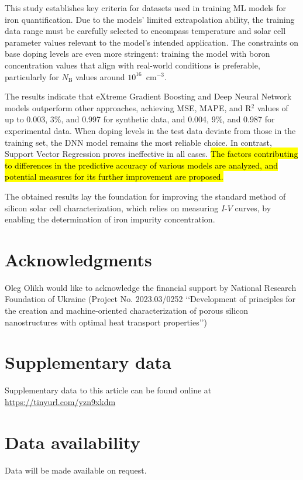 \documentclass[a4paper,fleqn,draft]{cas-sc}
\begin{document}
This study establishes key criteria for datasets used in training ML models for iron quantification.
Due to the models' limited extrapolation ability, the training data range must be carefully selected
to encompass temperature and solar cell parameter values relevant to the model’s intended application.
The constraints on base doping levels are even more stringent:
training the model with boron concentration values that align with real-world conditions is preferable, particularly for $N_\mathrm{B}$ values
around $10^{16}$~cm$^{-3}$.


The results indicate that eXtreme Gradient Boosting and Deep Neural Network models outperform other approaches,
achieving MSE, MAPE, and R$^2$ values of up to 0.003, 3\%, and 0.997 for synthetic data,
and 0.004, 9\%, and 0.987 for experimental data.
When doping levels in the test data deviate from those in the training set,
the DNN model remains the most reliable choice.
In contrast, Support Vector Regression proves ineffective in all cases.
\textcolor[rgb]{1.00,0.07,0.00}{
\hl{The factors contributing to differences in the predictive accuracy of various models are analyzed, and potential measures for its further improvement are proposed.
}}

The obtained results lay the foundation for improving the standard method of silicon solar cell characterization,
which relies on measuring $I$-$V$ curves,
by enabling the determination of iron impurity concentration.




\section*{Acknowledgments}
Oleg Olikh would like to acknowledge the financial support by
National Research Foundation of Ukraine (Project No. 2023.03/0252
‘‘Development of principles for the creation and machine-oriented
characterization of porous silicon nanostructures with optimal
heat transport properties’’)

\section*{Supplementary data}\label{SuplData}
Supplementary data to this article can be found online at
\url{https://tinyurl.com/yzn9xkdm}


\section*{Data availability}
Data will be made available on request.





%


\end{document}
